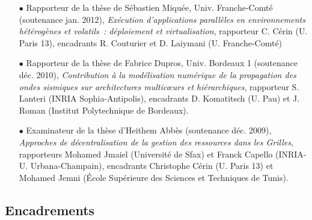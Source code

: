 \documentclass[11pt]{article}
\begin{document}
\begin{itemize}

\item[$\bullet$] 
Rapporteur de la thèse de Sébastien Miquée, Univ. Franche-Comté (soutenance 
jan. 2012), \textit{Exécution d'applications parallèles en environnements 
hétérogènes et volatils~: déploiement et virtualisation},
rapporteur C. Cérin (U. Paris 13), 
encadrants R. Couturier et D. Laiymani (U. Franche-Comté)\\

\item[$\bullet$] 
Rapporteur de la thèse de Fabrice Dupros, Univ. Bordeaux 1 (soutenance déc. 2010), 
\textit{Contribution à la modélisation numérique de la propagation des ondes 
sismiques sur architectures multic{\oe}urs et hiérarchiques},
rapporteur S. Lanteri (INRIA Sophia-Antipolis), 
encadrants D. Komatitsch (U. Pau) et J. Roman (Institut Polytechnique de 
Bordeaux).\\

\item[$\bullet$] 
Examinateur de la thèse d'Heithem Abbès (soutenance déc. 2009), 
\textit{Approches de décentralisation de la gestion des ressources dans les 
Grilles}, rapporteurs Mohamed Jmaiel (Université de Sfax) et Franck Capello 
(INRIA-U. Urbana-Champain), encadrants Christophe Cérin (U. Paris 13) et 
Mohamed Jemni (École Supérieure des Sciences et Techniques de Tunis).
\end{itemize}




\subsection{Encadrements}
\end{document}
